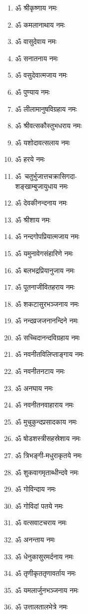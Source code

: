 \begin{multicols}{2}
\begin{enumerate}
\item ॐ श्रीकृष्णाय नमः
\item ॐ कमलानाथाय नमः
\item ॐ वासुदेवाय नमः
\item ॐ सनातनाय नमः
\item ॐ वसुदेवात्मजाय नमः
\item ॐ पुण्याय नमः
\item ॐ लीलामानुषविग्रहाय नमः
\item ॐ श्रीवत्सकौस्तुभधराय नमः
\item ॐ यशोदावत्सलाय नमः
\item ॐ हरये नमः
\item \mbox{ॐ चतुर्भुजात्तचक्रासिगदा-}\\ शङ्खाम्बुजायुधाय नमः
\item ॐ देवकीनन्दनाय नमः
\item ॐ श्रीशाय नमः
\item ॐ नन्दगोपप्रियात्मजाय नमः
\item ॐ यमुनावेगसंहारिणे नमः
\item ॐ बलभद्रप्रियानुजाय नमः
\item ॐ पूतनाजीवितहराय नमः
\item ॐ शकटासुरभञ्जनाय नमः
\item ॐ नन्दव्रजजनानन्दिने नमः
\item ॐ सच्चिदानन्दविग्रहाय नमः
\item ॐ नवनीतविलिप्ताङ्गाय नमः
\item ॐ नवनीतनटाय नमः
\item ॐ अनघाय नमः
\item ॐ नवनीतनवाहाराय नमः
\item ॐ मुचुकुन्दप्रसादकाय नमः
\item ॐ षोडशस्त्रीसहस्रेशाय नमः
\item ॐ त्रिभङ्गी-मधुराकृतये नमः
\item ॐ शुकवागमृताब्धीन्दवे नमः
\item ॐ गोविन्दाय  नमः
\item ॐ गोविदां पतये नमः
\item ॐ वत्सवाटचराय नमः
\item ॐ अनन्ताय नमः
\item ॐ धेनुकासुरमर्दनाय नमः
\item ॐ तृणीकृततृणावर्ताय नमः
\item ॐ यमलार्जुनभञ्जनाय नमः
\item ॐ उत्तालतालभेत्रे नमः

\end{enumerate}
\end{multicols}

